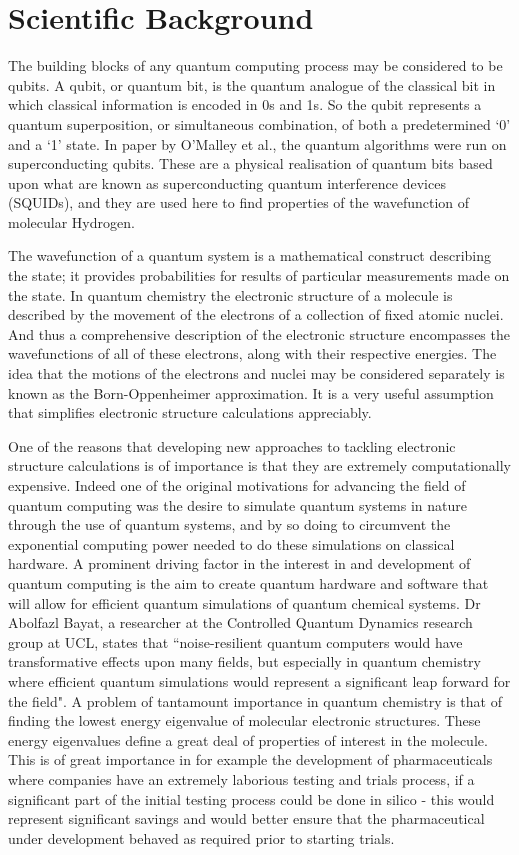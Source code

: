 \documentclass[12pt]{article}
\begin{document}
\section{Scientific Background}

The building blocks of any quantum computing process may be considered to be qubits. A qubit, or quantum bit, is the quantum analogue of the
classical bit in which classical information is encoded in 0s and 1s. So the qubit represents a quantum superposition, or simultaneous combination, of
both a predetermined `0’ and a `1’ state. In paper by O’Malley et al., the quantum algorithms were run on superconducting qubits. These are a
physical realisation of quantum bits based upon what are known as superconducting quantum interference devices (SQUIDs), and they are used here
to find properties of the wavefunction of molecular Hydrogen.

The wavefunction of a quantum system is a mathematical construct describing the state; it provides probabilities for results of particular measurements
 made on the state. In quantum chemistry the electronic structure of a molecule is described by the movement of the electrons of a collection of fixed
  atomic nuclei. And thus a comprehensive description of the electronic structure encompasses the wavefunctions of all of these electrons, along with
  their respective energies. The idea that the motions of the electrons and nuclei may be considered separately is known as the Born-Oppenheimer
  approximation. It is a very useful assumption that simplifies electronic structure calculations appreciably.

One of the reasons that developing new approaches to tackling electronic structure calculations is of importance is that they are extremely
computationally expensive. Indeed one of the original motivations for advancing the field of quantum computing was the desire to simulate quantum
 systems in nature through the use of quantum systems, and by so doing to circumvent the exponential computing power needed to do these simulations
 on classical hardware. A prominent driving factor in the interest in and development of quantum computing is the aim to create quantum hardware
 and software that will allow for efficient quantum simulations of quantum chemical systems. Dr Abolfazl Bayat, a researcher at the Controlled
 Quantum Dynamics research group at UCL, states that ``noise-resilient quantum computers would have transformative effects upon many fields,
 but especially in quantum chemistry where efficient quantum simulations would represent a significant leap forward for the field". A problem of
 tantamount importance in quantum chemistry is that of finding the lowest energy eigenvalue of molecular electronic structures. These energy
 eigenvalues define a great deal of properties of interest in the molecule. This is of great importance in for example the development of
 pharmaceuticals where companies have an extremely laborious testing and trials process, if a significant part of the initial testing process
 could be done in silico - this would represent significant savings and would better ensure that the pharmaceutical under development behaved as
 required prior to starting trials.
\end{document}
